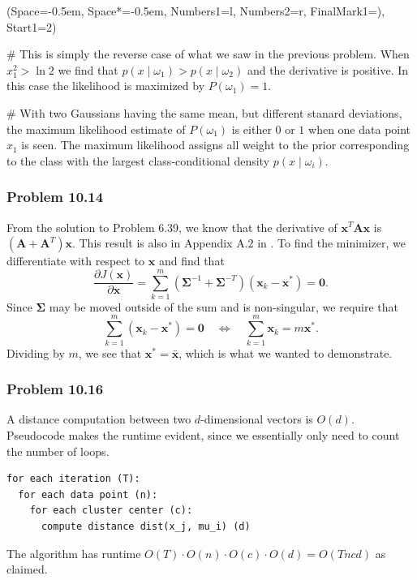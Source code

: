 \documentclass[12pt, a4paper]{article}
\newcommand{\listSpace}{-0.5em}%
\newcommand{\vect}[1]{\bm{#1}}
\begin{document}
{	\begin{easylist}[enumerate]
		\ListProperties(Space=\listSpace, Space*=\listSpace, Numbers1=l, Numbers2=r, FinalMark1={)}, Start1=2)

	 # This is simply the reverse case of what we saw in the previous problem. 
	 When $x_1^2 > \ln 2$ we find that $p(x \mid \omega_1) > p(x \mid \omega_2)$ and the derivative is positive.
	 In this case the likelihood is maximized by $P(\omega_1) = 1$.
	 
	 # With two Gaussians having the same mean, but different stanard deviations, the maximum likelihood estimate of $P(\omega_1)$ is either $0$ or $1$ when one data point $x_1$ is seen.
	 The maximum likelihood assigns all weight to the prior corresponding to the class with the largest class-conditional density $p(x \mid \omega_i)$.
	


\end{easylist}

\subsubsection*{Problem 10.14}
From the solution to Problem 6.39, we know that the derivative of $\vect{x}^T \vect{A} \vect{x}$ is $(\vect{A} + \vect{A}^T)\vect{x}$.
This result is also in Appendix A.2 in \cite{duda_pattern_2000}.
To find the minimizer, we differentiate with respect to $\vect{x}$ and find that
\begin{equation*}
	\frac{\partial J(\vect{x})}{\partial \vect{x}} = \sum_{k=1}^{m}
	\left( \vect{\Sigma}^{-1} + \vect{\Sigma}^{-T} \right)
	\left( \vect{x}_k - \vect{x}^* \right) = \vect{0}.
\end{equation*}
Since $\vect{\Sigma}$ may be moved outside of the sum and is non-singular, we require that 
\begin{equation*}
	\sum_{k=1}^{m}
	\left( \vect{x}_k - \vect{x}^* \right) = \vect{0}
	\quad 
	\Leftrightarrow
	\quad 
	\sum_{k=1}^{m}
	 \vect{x}_k  = m \vect{x}^*.
\end{equation*}
Dividing by $m$, we see that $\vect{x}^* = \bar{\vect{x}}$, which is what we wanted to demonstrate.






\subsubsection*{Problem 10.16}
A distance computation between two $d$-dimensional vectors is $O(d)$.
Pseudocode makes the runtime evident, since we essentially only need to count the number of loops.
\begin{Verbatim}
for each iteration (T):
  for each data point (n):
    for each cluster center (c):
      compute distance dist(x_j, mu_i) (d)
\end{Verbatim}
The algorithm has runtime $O(T) \cdot O(n) \cdot O(c) \cdot O(d) = O(Tncd)$ as claimed.



}
\end{document}
